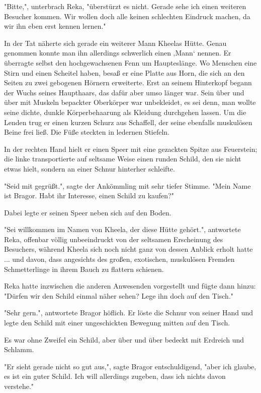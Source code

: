 \documentclass[10pt, a4paper, oneside]{book}
\begin{document}
\begin{multicols}{2}
"Bitte,", unterbrach Reka, "überstürzt es nicht. Gerade sehe ich einen weiteren Besucher kommen. Wir wollen doch alle keinen schlechten Eindruck machen, da wir ihn eben erst kennen lernen." 

In der Tat näherte sich gerade ein weiterer Mann Kheelas Hütte. Genau genommen konnte man ihn allerdings schwerlich einen ‚Mann‘ nennen. Er überragte selbst den hochgewachsenen Fenn um Haupteslänge. Wo Menschen eine Stirn und einen Scheitel haben, besaß er eine Platte aus Horn, die sich an den Seiten zu zwei gebogenen Hörnern erweiterte. Erst an seinem Hinterkopf begann der Wuchs seines Haupthaars, das dafür aber umso länger war. Sein über und über mit Muskeln bepackter Oberkörper war unbekleidet, es sei denn, man wollte seine dichte, dunkle Körperbehaarung als Kleidung durchgehen lassen. Um die Lenden trug er einen kurzen Schurz aus Schaffell, der seine ebenfalls muskulösen Beine frei ließ. Die Füße steckten in ledernen Stiefeln. 

In der rechten Hand hielt er einen Speer mit eine gezackten Spitze aus Feuerstein; die linke transportierte auf seltsame Weise einen runden Schild, den sie nicht etwas hielt, sondern an einer Schnur hinterher schleifte. 

"Seid mit gegrüßt.", sagte der Ankömmling mit sehr tiefer Stimme. "Mein Name ist Bragor. Habt ihr Interesse, einen Schild zu kaufen?" 

Dabei legte er seinen Speer neben sich auf den Boden. 

"Sei willkommen im Namen von Kheela, der diese Hütte gehört.", antwortete Reka, offenbar völlig unbeeindruckt von der seltsamen Erscheinung des Besuchers, während Kheela sich noch nicht ganz von dessen Anblick erholt hatte ... und davon, dass angesichts des großen, exotischen, muskulösen Fremden Schmetterlinge in ihrem Bauch zu flattern schienen. 

Reka hatte inzwischen die anderen Anwesenden vorgestellt und fügte dann hinzu: "Dürfen wir den Schild einmal näher sehen? Lege ihn doch auf den Tisch." 

"Sehr gern.", antwortete Bragor höflich. Er löste die Schnur von seiner Hand und legte den Schild mit einer ungeschickten Bewegung mitten auf den Tisch. 

Es war ohne Zweifel ein Schild, aber über und über bedeckt mit Erdreich und Schlamm. 

"Er sieht gerade nicht so gut aus,", sagte Bragor entschuldigend, "aber ich glaube, es ist ein guter Schild. Ich will allerdings zugeben, dass ich nichts davon verstehe." 


\end{multicols}
\end{document}
